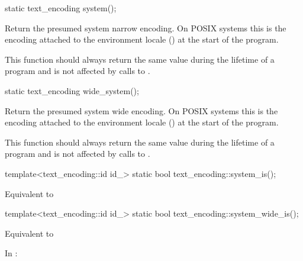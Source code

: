 \documentclass{wg21}
\begin{document}
\begin{addedblock}
\begin{itemdecl}
static text_encoding system();
\end{itemdecl}

\begin{itemdescr}
Return the presumed system narrow encoding.
On POSIX systems this is the encoding attached to the environment locale () at the start of the program.

\begin{note}
This function should always return the same value during the lifetime of a program and is not affected by calls to .
\end{note}
\end{itemdescr}

\begin{itemdecl}
static text_encoding wide_system();
\end{itemdecl}

\begin{itemdescr}
Return the presumed system wide encoding.
On POSIX systems this is the encoding attached to the environment locale () at the start of the program.

\begin{note}
This function should always return the same value during the lifetime of a program and is not affected by calls to .
\end{note}
\end{itemdescr}

\begin{itemdecl}
template<text_encoding::id id_>
static bool text_encoding::system_is();
\end{itemdecl}

\begin{itemdescr}
\returns Equivalent to 
\end{itemdescr}

\begin{itemdecl}
template<text_encoding::id id_>
static bool text_encoding::system_wide_is();
\end{itemdecl}

\begin{itemdescr}
\returns Equivalent to 
\end{itemdescr}


\end{addedblock}

In \tcode{[locale]}:
\end{document}

